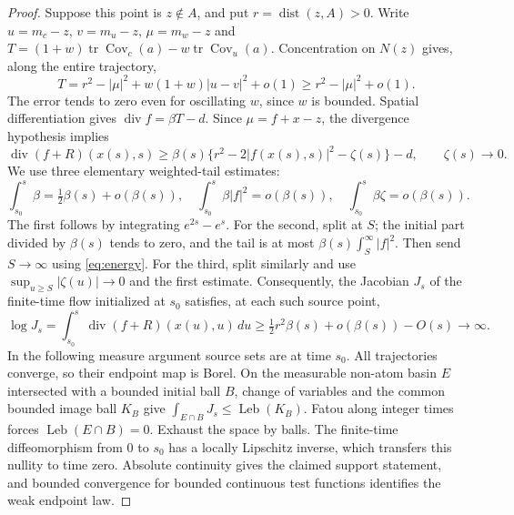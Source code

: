 \documentclass[11pt]{article}
\newcommand{\dist}{\operatorname{dist}}
\newcommand{\Cov}{\operatorname{Cov}}
\newcommand{\diver}{\operatorname{div}}
\newcommand{\tr}{\operatorname{tr}}
\begin{document}
\begin{proof}
Suppose this point is $z\notin A$, and put $r=\dist(z,A)>0$. Write
$u=m_c-z$, $v=m_u-z$, $\mu=m_w-z$ and
$T=(1+w)\tr\Cov_c(a)-w\tr\Cov_u(a)$. Concentration on $N(z)$ gives,
along the entire trajectory,
\[
 T=r^2-|\mu|^2+w(1+w)|u-v|^2+o(1)
 \ge r^2-|\mu|^2+o(1).
\]
The error tends to zero even for oscillating $w$, since $w$ is bounded.
Spatial differentiation gives $\diver f=\beta T-d$. Since
$\mu=f+x-z$, the divergence hypothesis implies
\[
 \diver(f+R)(x(s),s)
 \ge\beta(s)\{r^2-2|f(x(s),s)|^2-\zeta(s)\}-d,
 \qquad\zeta(s)\to0.
\]
We use three elementary weighted-tail estimates:
\[
 \int_{s_0}^s\beta=\tfrac12\beta(s)+o(\beta(s)),\quad
 \int_{s_0}^s\beta|f|^2=o(\beta(s)),\quad
 \int_{s_0}^s\beta\zeta=o(\beta(s)).
\]
The first follows by integrating $e^{2s}-e^s$. For the second, split at $S$;
the initial part divided by $\beta(s)$ tends to zero, and the tail is at most
$\beta(s)\int_S^\infty|f|^2$. Then send $S\to\infty$ using
\eqref{eq:energy}. For the third, split similarly and use
$\sup_{u\ge S}|\zeta(u)|\to0$ and the first estimate. Consequently, the
Jacobian $J_s$ of the finite-time flow initialized at $s_0$ satisfies, at each such source point,
\[
 \log J_s=\int_{s_0}^s\diver(f+R)(x(u),u)\,du
 \ge\tfrac12r^2\beta(s)+o(\beta(s))-O(s)\longrightarrow\infty.
\]
In the following measure argument source sets are at time $s_0$.
All trajectories converge, so their endpoint map is Borel. On the measurable
non-atom basin $E$ intersected with a bounded initial ball $B$, change of
variables and the common bounded image ball $K_B$ give
$\int_{E\cap B}J_s\le\operatorname{Leb}(K_B)$. Fatou along integer times
forces $\operatorname{Leb}(E\cap B)=0$. Exhaust the space by balls. The
finite-time diffeomorphism from $0$ to $s_0$ has a locally Lipschitz inverse,
which transfers this nullity to time zero. Absolute continuity gives the
claimed support statement, and bounded convergence for bounded continuous
test functions identifies the weak endpoint law.
\end{proof}
\end{document}

